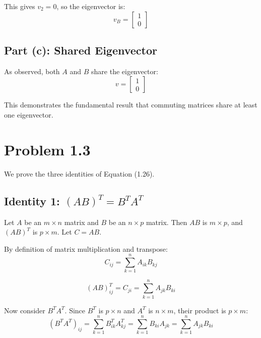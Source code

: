 This gives $v_2 = 0$, so the eigenvector is:
\begin{equation}
v_B = \begin{bmatrix} 1 \\ 0 \end{bmatrix}
\end{equation}

\subsection*{Part (c): Shared Eigenvector}

As observed, both $A$ and $B$ share the eigenvector:
\begin{equation}
v = \begin{bmatrix} 1 \\ 0 \end{bmatrix}
\end{equation}

This demonstrates the fundamental result that commuting matrices share at least one eigenvector.

\section*{Problem 1.3}

We prove the three identities of Equation (1.26).

\subsection*{Identity 1: $(AB)^T = B^T A^T$}

Let $A$ be an $m \times n$ matrix and $B$ be an $n \times p$ matrix. Then $AB$ is $m \times p$, and $(AB)^T$ is $p \times m$. Let $C = AB$.

By definition of matrix multiplication and transpose:
\begin{equation}
C_{ij} = \sum_{k=1}^{n} A_{ik} B_{kj}
\end{equation}

\begin{equation}
(AB)^T_{ij} = C_{ji} = \sum_{k=1}^{n} A_{jk} B_{ki}
\end{equation}

Now consider $B^T A^T$. Since $B^T$ is $p \times n$ and $A^T$ is $n \times m$, their product is $p \times m$:
\begin{equation}
(B^T A^T)_{ij} = \sum_{k=1}^{n} B^T_{ik} A^T_{kj} = \sum_{k=1}^{n} B_{ki} A_{jk} = \sum_{k=1}^{n} A_{jk} B_{ki}
\end{equation}

